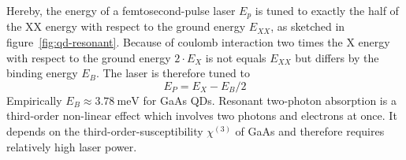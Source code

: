 Hereby, the energy of a femtosecond-pulse laser $E_p$ is tuned to exactly the half of the \ac{XX} energy with respect to the ground energy $E_{XX}$, as sketched in figure~\ref{fig:qd-resonant}.
Because of coulomb interaction two times the \ac{X} energy with respect to the ground energy $2 \cdot E_X$ is not equals $E_{XX}$ but differs by the binding energy $E_B$.
The laser is therefore tuned to 
\begin{equation}
E_P = E_X - E_B / 2
\end{equation}
Empirically $E_B \approx \SI{3.78}{\milli \electronvolt}$ for \ac{GaAs} \acp{QD}.
Resonant two-photon absorption is a third-order non-linear effect which involves two photons and electrons at once.
It depends on the third-order-susceptibility $\chi^{(3)}$ of \ac{GaAs} and therefore requires relatively high laser power.

